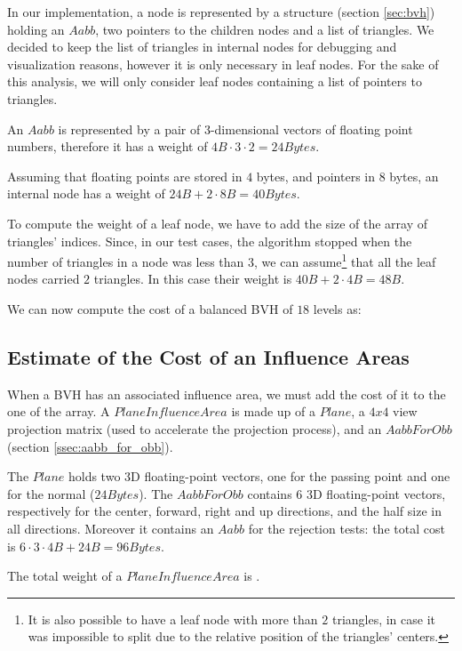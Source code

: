 \documentclass{PoliMi_MasterThesis}
\begin{document}
In our implementation, a node is represented by a structure (section \ref{sec:bvh}) holding an $Aabb$, two pointers to the children nodes and a list of triangles. We decided to keep the list of triangles in internal nodes for debugging and visualization reasons, however it is only necessary in leaf nodes. For the sake of this analysis, we will only consider leaf nodes containing a list of pointers to triangles. 

An $Aabb$ is represented by a pair of 3-dimensional vectors of floating point numbers, therefore it has a weight of $4B \cdot 3 \cdot 2 = 24 Bytes$.

Assuming that floating points are stored in $4$ bytes, and pointers in $8$ bytes, an internal node has a weight of $24B + 2 \cdot 8B = 40 Bytes$. 

To compute the weight of a leaf node, we have to add the size of the array of triangles' indices. Since, in our test cases, the algorithm stopped when the number of triangles in a node was less than 3, we can assume\footnote{It is also possible to have a leaf node with more than $2$ triangles, in case it was impossible to split due to the relative position of the triangles' centers.} that all the leaf nodes carried $2$ triangles. In this case their weight is $40B + 2 \cdot 4B = 48B$.

We can now compute the cost of a balanced BVH of $18$ levels as:
\unboldmath

\subsection*{Estimate of the Cost of an Influence Areas}
When a BVH has an associated influence area, we must add the cost of it to the one of the array. A $PlaneInfluenceArea$ is made up of a $Plane$, a $4x4$ view projection matrix (used to accelerate the projection process), and an $AabbForObb$ (section \ref{ssec:aabb_for_obb}).

The $Plane$ holds two 3D floating-point vectors, one for the passing point and one for the normal ($24 Bytes$). The $AabbForObb$ contains $6$ 3D floating-point vectors, respectively for the center, forward, right and up directions, and the half size in all directions. Moreover it contains an $Aabb$ for the rejection tests: the total cost is $6 \cdot 3 \cdot 4B + 24B= 96 Bytes$.

The total weight of a $PlaneInfluenceArea$ is \unboldmath.
\end{document}
